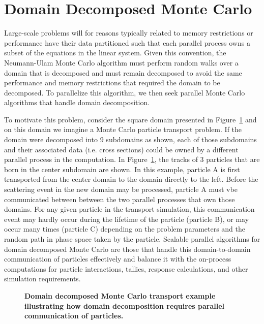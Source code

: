 \section{Domain Decomposed Monte Carlo\ }
\label{sec:msod}
Large-scale problems will for reasons typically related to memory
restrictions or performance have their data partitioned such that each
parallel process owns a subset of the equations in the linear
system. Given this convention, the Neumann-Ulam Monte Carlo algorithm
must perform random walks over a domain that is decomposed and must
remain decomposed to avoid the same performance and memory
restrictions that required the domain to be decomposed. To parallelize
this algorithm, we then seek parallel Monte Carlo algorithms that
handle domain decomposition.

To motivate this problem, consider the square domain presented in
Figure~\ref{fig:ddmc_example} and on this domain we imagine a Monte
Carlo particle transport problem. If the domain were decomposed into 9
subdomains as shown, each of those subdomains and their associated
data (i.e. cross sections) could be owned by a different parallel
process in the computation. In Figure~\ref{fig:ddmc_example}, the
tracks of 3 particles that are born in the center subdomain are
shown. In this example, particle A is first transported from the
center domain to the domain directly to the left. Before the
scattering event in the new domain may be processed, particle A must
vbe communicated between between the two parallel processes that own
those domains. For any given particle in the transport simulation,
this communication event may hardly occur during the lifetime of the
particle (particle B), or may occur many times (particle C) depending
on the problem parameters and the random path in phase space taken by
the particle. Scalable parallel algorithms for domain decomposed Monte
Carlo are those that handle this domain-to-domain communication of
particles effectively and balance it with the on-process computations
for particle interactions, tallies, response calculations, and other
simulation requirements.
\begin{figure}[t!]
  \begin{center}
    \scalebox{1.5}{
       }
  \end{center}
  \caption{\textbf{Domain decomposed Monte Carlo transport example
      illustrating how domain decomposition requires parallel
      communication of particles.}}
  \label{fig:ddmc_example}
\end{figure}

